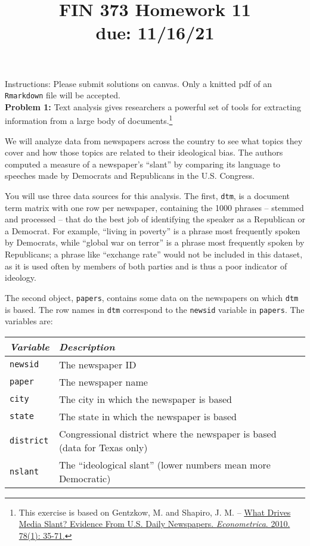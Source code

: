 \documentclass[11pt]{article}
\begin{document}
\title{FIN 373 Homework 11 \\ {\large due: \textbf{11/16/21}}}
\date{}
\maketitle

\vspace{-20mm}

\noindent Instructions: Please submit solutions on canvas.  Only a knitted pdf of an {\tt Rmarkdown} file will be accepted.
\\

\noindent \textbf{Problem 1:} Text analysis gives researchers a powerful set of tools for extracting information from a large body of documents.\footnote{This exercise is based on Gentzkow, M. and Shapiro, J. M. -- \href{http://dx.doi.org/10.3982/ECTA7195}{What Drives Media Slant? Evidence From U.S. Daily Newspapers. \textit{Econometrica}. 2010. 78(1): 35-71.}}

We will analyze data from newspapers across the country to see what topics they cover and how those topics are related to their ideological bias. The authors computed a measure of a newspaper's ``slant'' by comparing its language to speeches made by Democrats and Republicans in the U.S. Congress. 

You will use three data sources for this analysis. The first, {\tt dtm}, is a document term matrix with one row per newspaper, containing the 1000 phrases -- stemmed and processed -- that do the best job of identifying the speaker as a Republican or a Democrat. For example, ``living in poverty'' is a phrase most frequently spoken by Democrats, while ``global war on terror'' is a phrase most frequently spoken by Republicans; a phrase like ``exchange rate'' would not be included in this dataset, as it is used often by members of both parties and is thus a poor indicator of ideology. 

The second object, {\tt papers}, contains some data on the newspapers on which {\tt dtm} is based. The row names in {\tt dtm} correspond to the {\tt newsid} variable in {\tt papers}. The variables are:
\vspace{1mm}
\begin{center}
\begin{tabular}{l p{10cm}}
 \hline
\textit{Variable} & \textit{Description} \\
\hline
{\tt newsid}   &                   The newspaper ID \\
{\tt paper} &                      The newspaper name\\
{\tt city} &                       The city in which the newspaper is based\\
{\tt state} &                      The state in which the newspaper is based\\
{\tt district} &                   Congressional district where the newspaper is based (data for Texas only)\\
{\tt nslant} &                     The ``ideological slant'' (lower numbers mean more Democratic) \\
\hline
\end{tabular}
\end{center}
\end{document}
